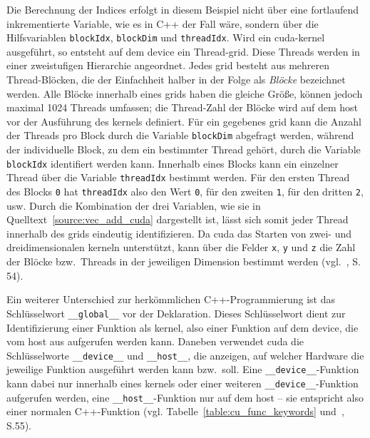 Die Berechnung der Indices erfolgt in diesem Beispiel nicht über eine fortlaufend inkrementierte Variable, wie es in C++
der Fall wäre, sondern über die Hilfsvariablen \texttt{blockIdx}, \texttt{blockDim} und \texttt{threadIdx}. Wird ein
\gls{cuda}-\gls{kernel} ausgeführt, so entsteht auf dem \gls{device} ein Thread-\gls{grid}. Diese Threads werden in
einer zweistufigen Hierarchie angeordnet. Jedes \gls{grid} besteht aus mehreren Thread-Blöcken, die der Einfachheit
halber in der Folge als \textit{Blöcke} bezeichnet werden. Alle Blöcke innerhalb eines \gls{grid}s haben die gleiche
Größe, können jedoch maximal 1024 Threads umfassen; die Thread-Zahl der Blöcke wird auf dem \gls{host} vor der
Ausführung des \gls{kernel}s definiert. Für ein gegebenes \gls{grid} kann die Anzahl der Threads pro Block durch die 
Variable \texttt{blockDim} abgefragt werden, während der individuelle Block, zu dem ein bestimmter Thread gehört, durch
die Variable \texttt{blockIdx} identifiert werden kann. Innerhalb eines Blocks kann ein einzelner Thread über die
Variable \texttt{threadIdx} bestimmt werden. Für den ersten Thread des Blocks \texttt{0} hat \texttt{threadIdx} also den
Wert \texttt{0}, für den zweiten \texttt{1}, für den dritten \texttt{2}, usw. Durch die Kombination der drei Variablen,
wie sie in Quelltext~\ref{source:vec_add_cuda} dargestellt ist, lässt sich somit jeder Thread innerhalb des \gls{grid}s
eindeutig identifizieren. Da \gls{cuda} das Starten von zwei- und dreidimensionalen \gls{kernel}n unterstützt, kann über
die Felder \texttt{x}, \texttt{y} und \texttt{z} die Zahl der Blöcke bzw.\ Threads in der jeweiligen Dimension bestimmt
werden (vgl.~\cite{kirkhwu}, S. 54).

Ein weiterer Unterschied zur herkömmlichen C++-Programmierung ist das Schlüsselwort \texttt{\_\_global\_\_} vor der
Deklaration. Dieses Schlüsselwort dient zur Identifizierung einer Funktion als \gls{kernel}, also einer Funktion auf
dem \gls{device}, die vom \gls{host} aus aufgerufen werden kann. Daneben verwendet \gls{cuda} die Schlüsselworte
\texttt{\_\_device\_\_} und \texttt{\_\_host\_\_}, die anzeigen, auf welcher Hardware die jeweilige Funktion ausgeführt
werden kann bzw.\ soll. Eine \texttt{\_\_device\_\_}-Funktion kann dabei nur innerhalb eines \gls{kernel}s oder einer
weiteren \texttt{\_\_device\_\_}-Funktion aufgerufen werden, eine \texttt{\_\_host\_\_}-Funktion nur auf dem \gls{host}
-- sie entspricht also einer normalen C++-Funktion (vgl. Tabelle~\ref{table:cu_func_keywords} und~\cite{kirkhwu}, S.55).

